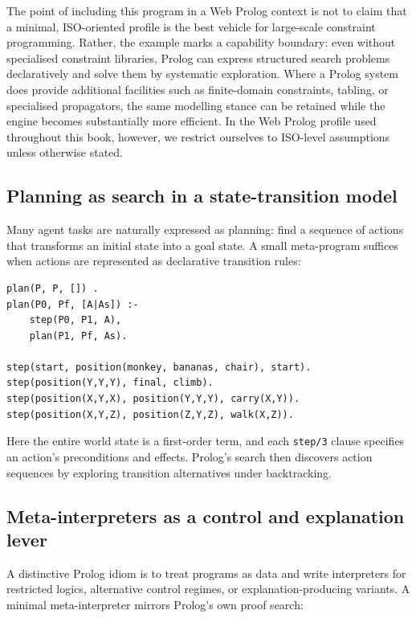 \noindent The point of including this program in a Web Prolog context is not to claim that a minimal, ISO-oriented profile is the best vehicle for large-scale constraint programming. Rather, the example marks a capability boundary: even without specialised constraint libraries, Prolog can express structured search problems declaratively and solve them by systematic exploration. Where a Prolog system does provide additional facilities such as finite-domain constraints, tabling, or specialised propagators, the same modelling stance can be retained while the engine becomes substantially more efficient. In the Web Prolog profile used throughout this book, however, we restrict ourselves to ISO-level assumptions unless otherwise stated.

\subsection{Planning as search in a state-transition model}

Many agent tasks are naturally expressed as planning: find a sequence of actions that transforms an initial state into a goal state. A small meta-program suffices when actions are represented as declarative transition rules:

\begin{verbatim}
plan(P, P, []) .
plan(P0, Pf, [A|As]) :-
    step(P0, P1, A),
    plan(P1, Pf, As).

step(start, position(monkey, bananas, chair), start).
step(position(Y,Y,Y), final, climb).
step(position(X,Y,X), position(Y,Y,Y), carry(X,Y)).
step(position(X,Y,Z), position(Z,Y,Z), walk(X,Z)).
\end{verbatim}

\noindent Here the entire world state is a first-order term, and each \texttt{step/3} clause specifies an action's preconditions and effects. Prolog's search then discovers action sequences by exploring transition alternatives under backtracking.

\subsection{Meta-interpreters as a control and explanation lever}
\label{sec:basic-meta-interpreter}

A distinctive Prolog idiom is to treat programs as data and write interpreters for restricted logics, alternative control regimes, or explanation-producing variants. A minimal meta-interpreter mirrors Prolog's own proof search:

